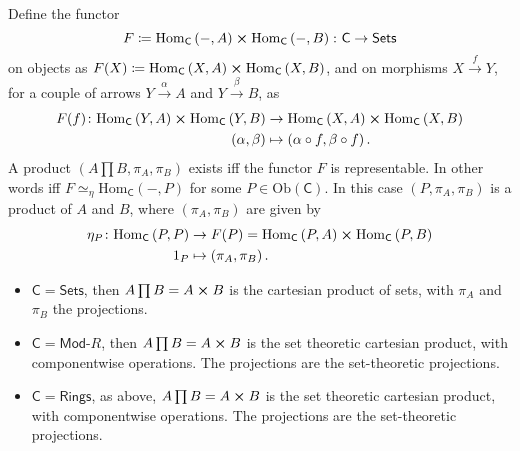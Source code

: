 \begin{prop}
	Define the functor 
	\begin{equation}
	F \coloneqq \mathrm{Hom}_{\mathsf{C}} \left( -, A \right) \cross \mathrm{Hom}_{\mathsf{C}} \left( -, B \right)\colon \mathsf{C} \to \mathsf{Sets}
	\end{equation} 
	on objects as $F(X) \coloneqq \mathrm{Hom}_{\mathsf{C}} \left( X, A \right) \cross \mathrm{Hom}_{\mathsf{C}} \left( X, B \right)$, and on morphisms $X \xrightarrow{f} Y$, for a couple of arrows $Y \xrightarrow{\alpha} A$ and $Y \xrightarrow{\beta} B$, as
	\begin{align}
		F(f)\colon \mathrm{Hom}_{\mathsf{C}} \left( Y, A \right) \cross \mathrm{Hom}_{\mathsf{C}} \left( Y, B \right) &\to \mathrm{Hom}_{\mathsf{C}} \left( X, A \right) \cross \mathrm{Hom}_{\mathsf{C}} \left( X, B \right) \\
		\left(\alpha, \beta\right) &\mapsto \left(\alpha \circ f, \beta \circ f \right)
	.\end{align} 
	A product $\left(A \prod B, \pi_A, \pi_B \right)$ exists iff the functor $F$ is representable.
	In other words iff $F \simeq_\eta \mathrm{Hom}_{\mathsf{C}} \left( -, P \right)$
	for some $P \in \mathrm{Ob} \left(\mathsf{C}\right)$.
	In this case $\left(P, \pi_A, \pi_B\right)$ is a product of $A$ and $B$,
	where $\left(\pi_A, \pi_B\right)$ are given by
	\begin{align}
		\eta_P\colon \mathrm{Hom}_{\mathsf{C}} \left( P, P \right) &\to F(P) =
		\mathrm{Hom}_{\mathsf{C}} \left( P, A \right) \cross 
		\mathrm{Hom}_{\mathsf{C}} \left( P, B \right)  \\
		1_P &\mapsto \left(\pi_A, \pi_B\right)
	.\end{align} 
\end{prop} 

\begin{ex}\leavevmode\vspace{-.2\baselineskip}
	\begin{itemize}
		\item $\mathsf{C} = \mathsf{Sets}$, then $A \prod B = A \cross B$ is the cartesian product of sets, with $\pi_A$ and $\pi_B$ the projections.
		\item $\mathsf{C} = \mathsf{Mod}\text{-}R$, then $A \prod B = A \cross B$ is the set theoretic cartesian product, with componentwise operations. The projections are the set-theoretic projections.
		\item $\mathsf{C} = \mathsf{Rings}$, as above, $A \prod B = A \cross B$ is the set theoretic cartesian product, with componentwise operations. The projections are the set-theoretic projections.
	\end{itemize}
\end{ex} 

